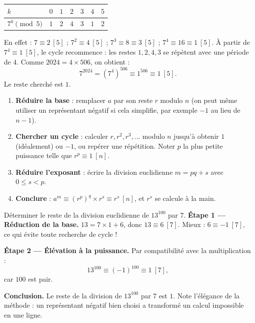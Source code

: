 \documentclass[11pt]{article}
\begin{document}
\begin{center}
\begin{tabularx}{\linewidth}{|l|X|X|X|X|X|X|}
\hline
\rowcolor{popblueL} $k$ & $0$ & $1$ & $2$ & $3$ & $4$ & $5$ \\
\hline
$7^k \pmod{5}$ & $1$ & $2$ & $4$ & $3$ & $1$ & $2$ \\
\hline
\end{tabularx}
\end{center}

En effet : $7 \equiv 2 \ [5]$ ; $7^2 \equiv 4 \ [5]$ ; $7^3 \equiv 8 \equiv 3 \ [5]$ ; $7^4 \equiv 16 \equiv 1 \ [5]$. À partir de $7^4 \equiv 1 \ [5]$, le cycle recommence : les restes $1, 2, 4, 3$ se répètent avec une période de $4$. Comme $2024 = 4 \times 506$, on obtient :
\[ 7^{2024} = \left(7^4\right)^{506} \equiv 1^{506} \equiv 1 \ [5]. \]
Le reste cherché est $\boxed{1}$.

\begin{methode}
\begin{enumerate}
\item \textbf{Réduire la base} : remplacer $a$ par son reste $r$ modulo $n$ (on peut même utiliser un représentant négatif si cela simplifie, par exemple $-1$ au lieu de $n-1$).
\item \textbf{Chercher un cycle} : calculer $r, r^2, r^3, \dots$ modulo $n$ jusqu'à obtenir $1$ (idéalement) ou $-1$, ou repérer une répétition. Noter $p$ la plus petite puissance telle que $r^p \equiv 1 \ [n]$.
\item \textbf{Réduire l'exposant} : écrire la division euclidienne $m = pq + s$ avec $0 \leq s < p$.
\item \textbf{Conclure} : $a^m \equiv (r^p)^q \times r^s \equiv r^s \ [n]$, et $r^s$ se calcule à la main.
\end{enumerate}
\end{methode}

\begin{exoresolu}
Déterminer le reste de la division euclidienne de $13^{100}$ par $7$.
\tcblower
\textbf{Étape 1 — Réduction de la base.} $13 = 7 \times 1 + 6$, donc $13 \equiv 6 \ [7]$. Mieux : $6 \equiv -1 \ [7]$, ce qui évite toute recherche de cycle !
\medskip

\textbf{Étape 2 — Élévation à la puissance.} Par compatibilité avec la multiplication :
\[ 13^{100} \equiv (-1)^{100} \equiv 1 \ [7], \]
car $100$ est pair.
\medskip

\textbf{Conclusion.} Le reste de la division de $13^{100}$ par $7$ est $\boxed{1}$. Note l'élégance de la méthode : un représentant négatif bien choisi a transformé un calcul impossible en une ligne.
\end{exoresolu}
\end{document}
